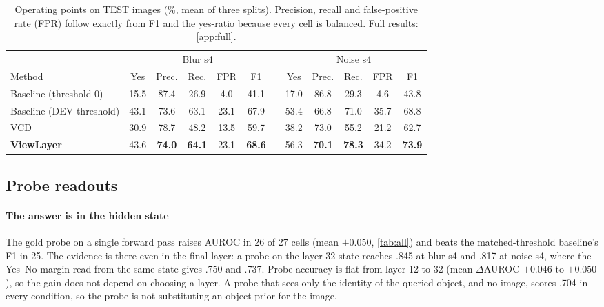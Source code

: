 \documentclass[10pt,a4paper]{article}
\newcommand{\ours}{ViewLayer}
\begin{document}
\begin{table}[t]
\centering\small
\caption{Operating points on TEST images (\%, mean of three splits). Precision, recall and false-positive rate (FPR) follow exactly from F1 and the yes-ratio because every cell is balanced. Full results: \cref{app:full}.}
\label{tab:op}
\begin{tabular}{@{}l ccccc c ccccc@{}}
\toprule
 & \multicolumn{5}{c}{Blur s4} & & \multicolumn{5}{c}{Noise s4}\\
\cmidrule(lr){2-6}\cmidrule(l){8-12}
Method & Yes & Prec. & Rec. & FPR & F1 & & Yes & Prec. & Rec. & FPR & F1\\
\midrule
Baseline (threshold 0)   & 15.5 & 87.4 & 26.9 & 4.0  & 41.1 & & 17.0 & 86.8 & 29.3 & 4.6  & 43.8\\
Baseline (DEV threshold) & 43.1 & 73.6 & 63.1 & 23.1 & 67.9 & & 53.4 & 66.8 & 71.0 & 35.7 & 68.8\\
VCD                      & 30.9 & 78.7 & 48.2 & 13.5 & 59.7 & & 38.2 & 73.0 & 55.2 & 21.2 & 62.7\\
\rowcolor{ours}\textbf{\ours{}} & 43.6 & \textbf{74.0} & \textbf{64.1} & 23.1 & \textbf{68.6} & & 56.3 & \textbf{70.1} & \textbf{78.3} & 34.2 & \textbf{73.9}\\
\bottomrule
\end{tabular}
\end{table}

\subsection{Probe readouts}\label{sec:proberes}
\paragraph{The answer is in the hidden state} The gold probe on a single forward pass raises AUROC in 26 of 27 cells (mean $+0.050$, \cref{tab:all}) and beats the matched-threshold baseline's F1 in 25. The evidence is there even in the final layer: a probe on the layer-32 state reaches .845 at blur s4 and .817 at noise s4, where the Yes--No margin read from the same state gives .750 and .737. Probe accuracy is flat from layer 12 to 32 (mean $\Delta$AUROC $+0.046$ to $+0.050$), so the gain does not depend on choosing a layer. A probe that sees only the identity of the queried object, and no image, scores .704 in every condition, so the probe is not substituting an object prior for the image.
\end{document}
